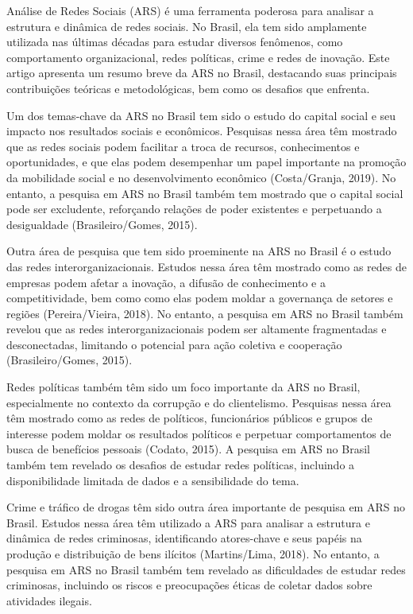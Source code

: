 Análise de Redes Sociais (ARS) é uma ferramenta poderosa para analisar a estrutura e dinâmica de redes sociais. No Brasil, ela tem sido amplamente utilizada nas últimas décadas para estudar diversos fenômenos, como comportamento organizacional, redes políticas, crime e redes de inovação. Este artigo apresenta um resumo breve da ARS no Brasil, destacando suas principais contribuições teóricas e metodológicas, bem como os desafios que enfrenta.

Um dos temas-chave da ARS no Brasil tem sido o estudo do capital social e seu impacto nos resultados sociais e econômicos. Pesquisas nessa área têm mostrado que as redes sociais podem facilitar a troca de recursos, conhecimentos e oportunidades, e que elas podem desempenhar um papel importante na promoção da mobilidade social e no desenvolvimento econômico (Costa/Granja, 2019). No entanto, a pesquisa em ARS no Brasil também tem mostrado que o capital social pode ser excludente, reforçando relações de poder existentes e perpetuando a desigualdade (Brasileiro/Gomes, 2015).

Outra área de pesquisa que tem sido proeminente na ARS no Brasil é o estudo das redes interorganizacionais. Estudos nessa área têm mostrado como as redes de empresas podem afetar a inovação, a difusão de conhecimento e a competitividade, bem como como elas podem moldar a governança de setores e regiões (Pereira/Vieira, 2018). No entanto, a pesquisa em ARS no Brasil também revelou que as redes interorganizacionais podem ser altamente fragmentadas e desconectadas, limitando o potencial para ação coletiva e cooperação (Brasileiro/Gomes, 2015).

Redes políticas também têm sido um foco importante da ARS no Brasil, especialmente no contexto da corrupção e do clientelismo. Pesquisas nessa área têm mostrado como as redes de políticos, funcionários públicos e grupos de interesse podem moldar os resultados políticos e perpetuar comportamentos de busca de benefícios pessoais (Codato, 2015). A pesquisa em ARS no Brasil também tem revelado os desafios de estudar redes políticas, incluindo a disponibilidade limitada de dados e a sensibilidade do tema.

Crime e tráfico de drogas têm sido outra área importante de pesquisa em ARS no Brasil. Estudos nessa área têm utilizado a ARS para analisar a estrutura e dinâmica de redes criminosas, identificando atores-chave e seus papéis na produção e distribuição de bens ilícitos (Martins/Lima, 2018). No entanto, a pesquisa em ARS no Brasil também tem revelado as dificuldades de estudar redes criminosas, incluindo os riscos e preocupações éticas de coletar dados sobre atividades ilegais.

